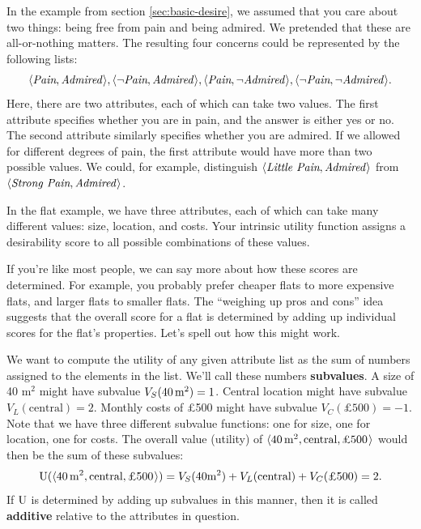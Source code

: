 In the example from section \ref{sec:basic-desire}, we assumed that you care
about two things: being free from pain and being admired. We pretended that
these are all-or-nothing matters. The resulting four concerns could be
represented by the following lists:
\[
  \t{\emph{Pain}, \emph{Admired}}, \t{\neg\emph{Pain}, \emph{Admired}}, \t{\emph{Pain}, \neg\emph{Admired}}, \t{\neg\emph{Pain}, \neg\emph{Admired}}.
\]
Here, there are two attributes, each of which can take two values. The first
attribute specifies whether you are in pain, and the answer is either yes or no.
The second attribute similarly specifies whether you are admired. If we allowed
for different degrees of pain, the first attribute would have more than two
possible values. We could, for example, distinguish
$\t{\emph{Little Pain}, \emph{Admired}}$ from
$\t{\emph{Strong Pain}, \emph{Admired}}$.


In the flat example, we have three attributes, each of which can take many
different values: size, location, and costs. Your intrinsic utility function
assigns a desirability score to all possible combinations of these values.

If you're like most people, we can say more about how these scores are
determined. For example, you probably prefer cheaper flats to more expensive
flats, and larger flats to smaller flats. The ``weighing up pros and cons'' idea
suggests that the overall score for a flat is determined by adding up individual
scores for the flat's properties. Let's spell out how this might work.

We want to compute the utility of any given attribute list as the sum of numbers
assigned to the elements in the list. We'll call these numbers
\textbf{subvalues}. A size of 40 m$^{2}$ might have subvalue
$V_{S}(40\, \text{m}^2) = 1$. Central location might have subvalue
$V_{L}(\text{central}) = 2$. Monthly costs of £500 might have subvalue
$V_{C}(\text{£500}) = -1$. Note that we have three different subvalue functions:
one for size, one for location, one for costs. The overall value (utility) of
$\t{40\, \m^2, \text{central}, \text{£500}}$ would then be the sum of these
subvalues:
\[
\U(\t{40\, \m^2, \text{central}, \text{£500}}) = V_{S}(40 \m^2) +
V_{L}(\text{central}) + V_{C}(\text{£500}) = 2.
\]
%
If $\text{U}$ is determined by adding up subvalues in this manner, then it is called
\textbf{additive} relative to the attributes in question.

